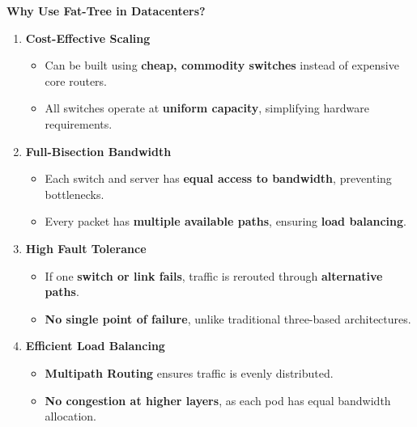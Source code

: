 \highspace
\begin{flushleft}
    \textcolor{Green3}{ \textbf{Why Use Fat-Tree in Datacenters?}}
\end{flushleft}
\begin{enumerate}[label=\textcolor{Green3}{\faIcon{check}}]
    \item \textcolor{Green3}{\textbf{Cost-Effective Scaling}}
    \begin{itemize}
        \item Can be built using \textbf{cheap, commodity switches} instead of expensive core routers.
        \item All switches operate at \textbf{uniform capacity}, simplifying hardware requirements.
    \end{itemize}
    \item \textcolor{Green3}{\textbf{Full-Bisection Bandwidth}}
    \begin{itemize}
        \item Each switch and server has \textbf{equal access to bandwidth}, preventing bottlenecks.
        \item Every packet has \textbf{multiple available paths}, ensuring \textbf{load balancing}.
    \end{itemize}
    \item \textcolor{Green3}{\textbf{High Fault Tolerance}}
    \begin{itemize}
        \item If one \textbf{switch or link fails}, traffic is rerouted through \textbf{alternative paths}.
        \item \textbf{No single point of failure}, unlike traditional three-based architectures.
    \end{itemize}
    \item \textcolor{Green3}{\textbf{Efficient Load Balancing}}
    \begin{itemize}
        \item \textbf{Multipath Routing} ensures traffic is evenly distributed.
        \item \textbf{No congestion at higher layers}, as each pod has equal bandwidth allocation.
    \end{itemize}
\end{enumerate}


